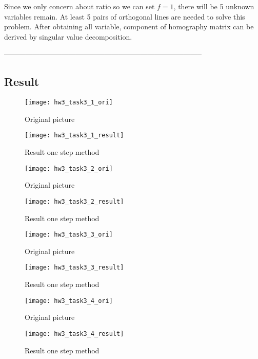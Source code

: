 \documentclass[11pt]{article}
\begin{document}
Since we only concern about ratio so we can set $f = 1$, there will be 5 unknown variables remain. At least 5 pairs of orthogonal lines are needed to solve this problem. After obtaining all variable, component of homography matrix can be derived by singular value decomposition. 

-----------------------------------------------------------------------------------

\subsection*{Result}

\begin{figure}[H]
\centering
\texttt{[image: hw3\_task3\_1\_ori]}
\caption{Original picture}
\label{}
\end{figure}

\begin{figure}[H]
\centering
\texttt{[image: hw3\_task3\_1\_result]}
\caption{Result one step method}
\label{}
\end{figure}

\begin{figure}[H]
\centering
\texttt{[image: hw3\_task3\_2\_ori]}
\caption{Original picture}
\label{}
\end{figure}

\begin{figure}[H]
\centering
\texttt{[image: hw3\_task3\_2\_result]}
\caption{Result one step method}
\label{}
\end{figure}

\begin{figure}[H]
\centering
\texttt{[image: hw3\_task3\_3\_ori]}
\caption{Original picture}
\label{}
\end{figure}

\begin{figure}[H]
\centering
\texttt{[image: hw3\_task3\_3\_result]}
\caption{Result one step method}
\label{}
\end{figure}

\begin{figure}[H]
\centering
\texttt{[image: hw3\_task3\_4\_ori]}
\caption{Original picture}
\label{}
\end{figure}

\begin{figure}[H]
\centering
\texttt{[image: hw3\_task3\_4\_result]}
\caption{Result one step method}
\label{}
\end{figure}
\end{document}
